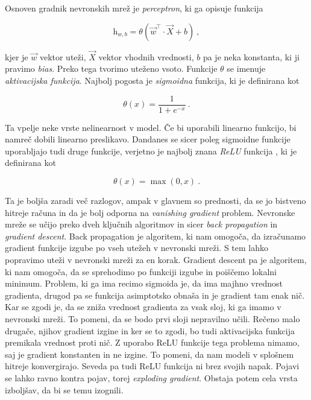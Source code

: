 \documentclass[a4paper]{article}
\begin{document}
Osnoven gradnik nevronskih mrež je \textit{perceptron}, ki ga opisuje funkcija 

\begin{equation}
    \mathrm{h}_{w,b} = \theta(\vec{w}^\intercal\cdot \vec{X}+ b)\>,
\end{equation}

kjer je $\vec{w}$ vektor uteži, $\vec{X}$ vektor vhodnih vrednosti, $b$ pa je neka konstanta, ki ji pravimo \textit{bias}.
Preko tega tvorimo uteženo vsoto. Funkcije $\theta$ se imenuje \textit{aktivacijska funkcija}. Najbolj pogosta je
\textit{sigmoidna} funkcija, ki je definirana kot

\begin{equation}
    \theta(x) = \frac{1}{1+e^{-x}}\>.
\end{equation}

Ta vpelje neke vrste nelinearnost v model. Če bi uporabili linearno funkcijo, bi namreč dobili linearno preslikavo. 
Dandanes se sicer poleg sigmoidne funkcije uporabljajo tudi druge funkcije, verjetno je najbolj znana \textit{ReLU}
funkcija \cite{agarap2019deep}, ki je definirana kot

\begin{equation}
    \theta(x) = \max(0,x)\>.
\end{equation}

Ta je boljša zaradi več razlogov, ampak v glavnem so prednosti, da se jo bistveno hitreje računa in da je bolj odporna
na \textit{vanishing gradient} problem. Nevronske mreže se učijo preko dveh ključnih algoritmov in sicer \textit{back propagation}
in \textit{gradient descent}. Back propagation je algoritem, ki nam omogoča, da izračunamo gradient funkcije izgube po
vseh utežeh v nevronski mreži. S tem lahko popravimo uteži v nevronski mreži za en korak. Gradient descent pa je algoritem,
ki nam omogoča, da se sprehodimo po funkciji izgube in poiščemo lokalni minimum. Problem, ki ga ima recimo sigmoida je, da
ima majhno vrednost gradienta, drugod pa se funkcija asimptotsko obnaša in je gradient tam enak nič. Kar se zgodi je, da 
se zniža vrednost gradienta za vsak sloj, ki ga imamo v nevronski mreži. To pomeni, da se bodo prvi sloji nepravilno 
učili. Rečeno malo drugače, njihov gradient izgine in ker se to zgodi, bo tudi aktivacijska funkcija premikala vrednost 
proti nič. Z uporabo ReLU funkcije tega problema nimamo, saj je gradient konstanten in ne izgine. To pomeni, da nam modeli 
v splošnem hitreje konvergirajo. Seveda pa tudi ReLU funkcija ni brez svojih napak. Pojavi se lahko ravno kontra pojav, 
torej \textit{exploding gradient}. Obstaja potem cela vrsta izboljšav, da bi se temu izognili. \\
\end{document}
